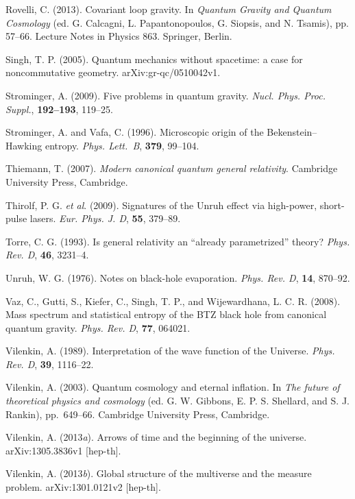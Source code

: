 \documentclass[12pt]{article}
\begin{document}
\bibitem{} Rovelli, C. (2013). Covariant loop gravity. In
{\em Quantum Gravity and Quantum Cosmology} (ed.
 G. Calcagni, L. Papantonopoulos, G. Siopsis, and
  N. Tsamis), pp. 57--66.
Lecture Notes in Physics 863. Springer, Berlin.

\bibitem{} Singh, T. P. (2005). Quantum mechanics without
  spacetime: a case for noncommutative geometry.
    arXiv:gr-qc/0510042v1.

\bibitem{} Strominger, A. (2009). Five problems in quantum gravity.
           {\em Nucl. Phys. Proc. Suppl.}, {\bf 192--193}, 119--25.

\bibitem{} Strominger, A. and Vafa, C. (1996). Microscopic origin of the
           Bekenstein--Hawking entropy. {\em Phys. Lett.~B}, {\bf 379},
           99--104.

\bibitem{} Thiemann, T. (2007). {\em Modern canonical 
           quantum general relativity}. Cambridge University Press,
           Cambridge. 

\bibitem{} Thirolf, P. G. {\em et al}. (2009). Signatures of the Unruh
   effect via high-power, short-pulse lasers. {\em Eur. Phys. J. D}, {\bf
   55}, 379--89.

\bibitem{} Torre, C. G. (1993). Is general relativity an 
             ``already parametrized'' theory? {\em Phys. Rev. D}, {\bf 46},
             3231--4.

\bibitem{} Unruh, W. G. (1976). Notes on black-hole evaporation.
           {\em Phys. Rev. D}, {\bf 14}, 870--92. 

\bibitem{} Vaz, C., Gutti, S., Kiefer, C., Singh, T. P., and
           Wijewardhana, L. C. R. (2008).
           Mass spectrum and statistical entropy of the BTZ black hole
           from canonical quantum gravity. 
           {\em Phys. Rev. D}, {\bf 77}, 064021.

\bibitem{} Vilenkin, A. (1989). Interpretation of the wave function of the
           Universe. {\em Phys. Rev. D}, {\bf 39}, 1116--22. 

\bibitem{} Vilenkin, A. (2003). Quantum cosmology and eternal inflation.
           In {\em The future of theoretical physics and cosmology}
           (ed. G. W. Gibbons, E. P. S. Shellard, and S. J. Rankin),
           pp.~649--66. Cambridge University Press, Cambridge.

\bibitem{} Vilenkin, A. (2013{\em a}). Arrows of time and the beginning of
  the universe. arXiv:1305.3836v1 [hep-th].

\bibitem{} Vilenkin, A. (2013{\em b}). Global structure of the
  multiverse and the measure problem.  arXiv:1301.0121v2 [hep-th].
\end{document}
